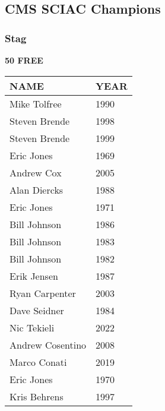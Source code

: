 \vspace{0.4cm}

\newpage

\subsection{CMS SCIAC Champions}
\subsubsection{Stag}

\begin{minipage}[t]{0.48\textwidth}
\centering
\textbf{50 FREE}\\[0.05cm]
\begin{tabular}{@{}p{2.8cm}p{1.2cm}@{}}
\hline
\textbf{NAME} & \textbf{YEAR} \\
\hline
Mike Tolfree & 1990 \\
Steven Brende & 1998 \\
Steven Brende & 1999 \\
Eric Jones & 1969 \\
Andrew Cox & 2005 \\
Alan Diercks & 1988 \\
Eric Jones & 1971 \\
Bill Johnson & 1986 \\
Bill Johnson & 1983 \\
Bill Johnson & 1982 \\
Erik Jensen & 1987 \\
Ryan Carpenter & 2003 \\
Dave Seidner & 1984 \\
Nic Tekieli & 2022 \\
Andrew Cosentino & 2008 \\
Marco Conati & 2019 \\
Eric Jones & 1970 \\
Kris Behrens & 1997 \\
\hline
\end{tabular}
\end{minipage}\hfill
